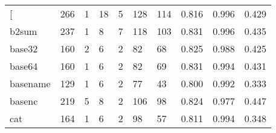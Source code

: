 \begin{longtable}{lp{2.0cm}p{2.0cm}p{2.0cm}p{2.0cm}p{2.0cm}p{2.0cm}p{2.0cm}p{2.0cm}p{2.0cm}}
\bottomrule
\endlastfoot
{[}         &                    266 &                                  1 &                                18 &                                5 &                               128 &                             114 &                                   0.816 &                                  0.996 &                                0.429 \\
b2sum     &                    237 &                                  1 &                                 8 &                                7 &                               118 &                             103 &                                   0.831 &                                  0.996 &                                0.435 \\
base32    &                    160 &                                  2 &                                 6 &                                2 &                                82 &                              68 &                                   0.825 &                                  0.988 &                                0.425 \\
base64    &                    160 &                                  1 &                                 6 &                                2 &                                82 &                              69 &                                   0.831 &                                  0.994 &                                0.431 \\
basename  &                    129 &                                  1 &                                 6 &                                2 &                                77 &                              43 &                                   0.800 &                                  0.992 &                                0.333 \\
basenc    &                    219 &                                  5 &                                 8 &                                2 &                               106 &                              98 &                                   0.824 &                                  0.977 &                                0.447 \\
cat       &                    164 &                                  1 &                                 6 &                                2 &                                98 &                              57 &                                   0.811 &                                  0.994 &                                0.348 \\

\end{longtable}
